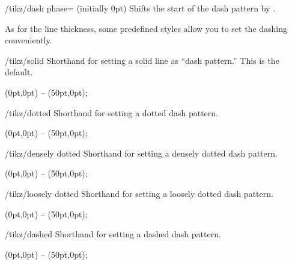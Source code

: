 \begin{key}{/tikz/dash phase= (initially 0pt)}
  Shifts the start of the dash pattern by .

\begin{codeexample}[]
\begin{tikzpicture}[dash pattern=on 20pt off 10pt]
  \draw[dash phase=0pt] (0pt,3pt) -- (3.5cm,3pt);
  \draw[dash phase=10pt] (0pt,0pt) -- (3.5cm,0pt);
\end{tikzpicture}
\end{codeexample}
\end{key}

As for the line thickness, some predefined styles allow you to set the
dashing conveniently.

\begin{stylekey}{/tikz/solid}
  Shorthand for setting a solid line as ``dash pattern.'' This is the default.

\begin{codeexample}[]
\tikz \draw[solid] (0pt,0pt) -- (50pt,0pt);
\end{codeexample}
\end{stylekey}

\begin{stylekey}{/tikz/dotted}
  Shorthand for setting a dotted dash pattern.

\begin{codeexample}[]
\tikz \draw[dotted] (0pt,0pt) -- (50pt,0pt);
\end{codeexample}
\end{stylekey}

\begin{stylekey}{/tikz/densely dotted}
  Shorthand for setting a densely dotted dash pattern.

\begin{codeexample}[]
\tikz {} (0pt,0pt) -- (50pt,0pt);
\end{codeexample}
\end{stylekey}

\begin{stylekey}{/tikz/loosely dotted}
  Shorthand for setting a loosely dotted dash pattern.

\begin{codeexample}[]
\tikz {} (0pt,0pt) -- (50pt,0pt);
\end{codeexample}
\end{stylekey}

\begin{stylekey}{/tikz/dashed}
  Shorthand for setting a dashed dash pattern.

\begin{codeexample}[]
\tikz \draw[dashed] (0pt,0pt) -- (50pt,0pt);
\end{codeexample}
\end{stylekey}

